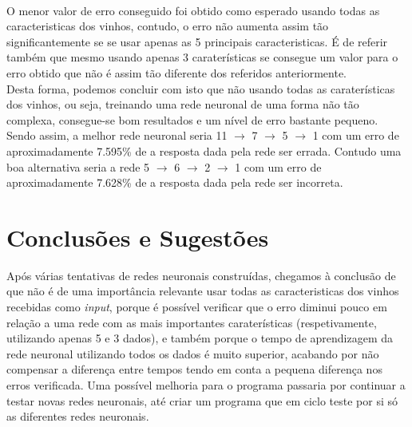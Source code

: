\documentclass{article}
\begin{document}
\\
O menor valor de erro conseguido foi obtido como esperado usando todas as caracteristicas dos vinhos, contudo, o erro não aumenta assim tão significantemente se se usar apenas as 5 principais caracteristicas. É de referir também que mesmo usando apenas 3 caraterísticas se consegue um valor para o erro obtido que não é assim tão diferente dos referidos anteriormente.\\
Desta forma, podemos concluir com isto que não usando todas as caraterísticas dos vinhos, ou seja, treinando uma rede neuronal de uma forma não tão complexa, consegue-se bom resultados e um nível de erro bastante pequeno.
Sendo assim, a melhor rede neuronal seria 11 $\to$ 7 $\to$ 5 $\to$ 1 com um erro de aproximadamente 7.595\% de a resposta dada pela rede ser errada. Contudo uma boa alternativa seria a rede 5 $\to$ 6 $\to$ 2 $\to$ 1 com um erro de aproximadamente 7.628\% de a resposta dada pela rede ser incorreta.

\newpage

\vspace*{\fill}
\section{Conclusões e Sugestões}
Após várias tentativas de redes neuronais construídas, chegamos à conclusão de que não é de uma importância relevante usar todas as caracteristicas dos vinhos recebidas como \textit{input}, porque é possível verificar que o erro diminui pouco em relação a uma rede com as mais importantes caraterísticas (respetivamente, utilizando apenas 5 e 3 dados), e também porque o tempo de aprendizagem da rede neuronal utilizando todos os dados é muito superior, acabando por não compensar a diferença entre tempos tendo em conta a pequena diferença nos erros verificada. Uma possível melhoria para o programa passaria por continuar a testar novas redes neuronais, até criar um programa que em ciclo teste por si só as diferentes redes neuronais.
\vspace*{\fill}
\end{document}
